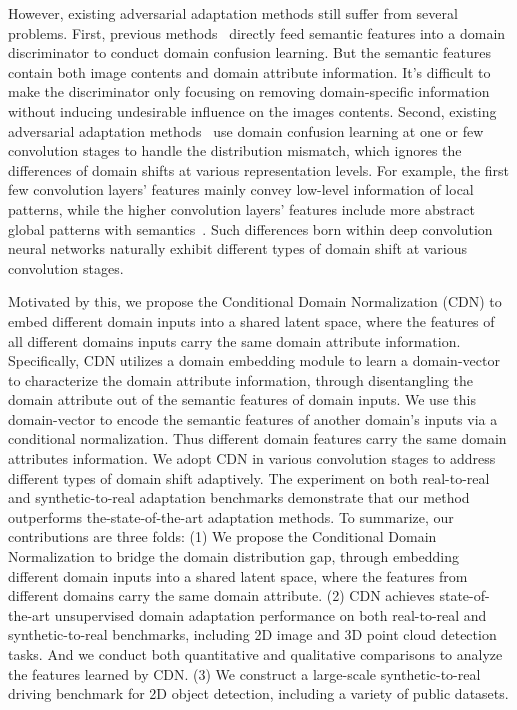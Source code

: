 \documentclass[runningheads]{llncs}
\begin{document}
However, existing adversarial adaptation methods still suffer from several problems.
First, previous methods~\cite{chen2018domain,ganin2015unsupervised,tobin2017domain} directly feed semantic features into a domain discriminator to conduct domain confusion learning.
But the semantic features contain both image contents and domain attribute information.
It's difficult to make the discriminator only focusing on removing domain-specific information without inducing undesirable influence on the images contents.
Second, existing adversarial adaptation methods~\cite{chen2018domain,ganin2015unsupervised,tobin2017domain}
use domain confusion learning at one or few convolution stages to handle the distribution mismatch, which ignores the differences of domain shifts at various representation levels.
For example, the first few convolution layers' features mainly convey low-level information of local patterns, while the higher convolution layers' features include more abstract global patterns with semantics~\cite{yosinski2015understanding}.
Such differences born within deep convolution neural networks naturally exhibit different types of domain shift at various convolution stages.



Motivated by this, we propose the Conditional Domain Normalization (CDN) to embed different domain inputs into a shared latent space, where the features of all different domains inputs carry the same domain attribute information.
Specifically,  CDN utilizes a domain embedding module to learn a domain-vector to characterize the domain attribute information, through disentangling the domain attribute out of the semantic features of domain inputs.
We use this domain-vector to encode the semantic features of another domain's inputs via a conditional normalization.
Thus different domain features carry the same domain attributes information.
We adopt CDN in various convolution stages to address different types of domain shift adaptively.
The experiment on both real-to-real and synthetic-to-real adaptation benchmarks demonstrate that our method outperforms the-state-of-the-art adaptation methods.
To summarize, our contributions are three folds:
(1) We propose the Conditional Domain Normalization to bridge the domain distribution gap, through embedding different domain inputs into a shared latent space, where the features from different domains carry the same domain attribute.
(2) CDN achieves state-of-the-art unsupervised domain adaptation performance on both real-to-real and synthetic-to-real benchmarks, including  2D image and 3D point cloud detection tasks.
And we conduct both quantitative and qualitative comparisons to analyze the features learned by CDN.
(3) We construct a large-scale synthetic-to-real driving benchmark for 2D object detection, including a variety of public datasets.
\end{document}
